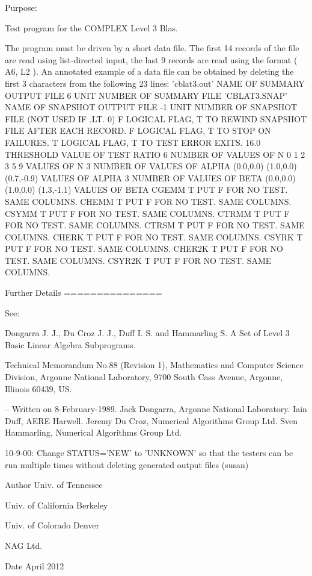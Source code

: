 \begin{DoxyParagraph}{Purpose\+: }
\begin{DoxyVerb} Test program for the COMPLEX          Level 3 Blas.

 The program must be driven by a short data file. The first 14 records
 of the file are read using list-directed input, the last 9 records
 are read using the format ( A6, L2 ). An annotated example of a data
 file can be obtained by deleting the first 3 characters from the
 following 23 lines:
 'cblat3.out'      NAME OF SUMMARY OUTPUT FILE
 6                 UNIT NUMBER OF SUMMARY FILE
 'CBLAT3.SNAP'     NAME OF SNAPSHOT OUTPUT FILE
 -1                UNIT NUMBER OF SNAPSHOT FILE (NOT USED IF .LT. 0)
 F        LOGICAL FLAG, T TO REWIND SNAPSHOT FILE AFTER EACH RECORD.
 F        LOGICAL FLAG, T TO STOP ON FAILURES.
 T        LOGICAL FLAG, T TO TEST ERROR EXITS.
 16.0     THRESHOLD VALUE OF TEST RATIO
 6                 NUMBER OF VALUES OF N
 0 1 2 3 5 9       VALUES OF N
 3                 NUMBER OF VALUES OF ALPHA
 (0.0,0.0) (1.0,0.0) (0.7,-0.9)       VALUES OF ALPHA
 3                 NUMBER OF VALUES OF BETA
 (0.0,0.0) (1.0,0.0) (1.3,-1.1)       VALUES OF BETA
 CGEMM  T PUT F FOR NO TEST. SAME COLUMNS.
 CHEMM  T PUT F FOR NO TEST. SAME COLUMNS.
 CSYMM  T PUT F FOR NO TEST. SAME COLUMNS.
 CTRMM  T PUT F FOR NO TEST. SAME COLUMNS.
 CTRSM  T PUT F FOR NO TEST. SAME COLUMNS.
 CHERK  T PUT F FOR NO TEST. SAME COLUMNS.
 CSYRK  T PUT F FOR NO TEST. SAME COLUMNS.
 CHER2K T PUT F FOR NO TEST. SAME COLUMNS.
 CSYR2K T PUT F FOR NO TEST. SAME COLUMNS.

 Further Details
 ===============

 See:

    Dongarra J. J., Du Croz J. J., Duff I. S. and Hammarling S.
    A Set of Level 3 Basic Linear Algebra Subprograms.

    Technical Memorandum No.88 (Revision 1), Mathematics and
    Computer Science Division, Argonne National Laboratory, 9700
    South Cass Avenue, Argonne, Illinois 60439, US.

 -- Written on 8-February-1989.
    Jack Dongarra, Argonne National Laboratory.
    Iain Duff, AERE Harwell.
    Jeremy Du Croz, Numerical Algorithms Group Ltd.
    Sven Hammarling, Numerical Algorithms Group Ltd.

    10-9-00:  Change STATUS='NEW' to 'UNKNOWN' so that the testers
              can be run multiple times without deleting generated
              output files (susan)\end{DoxyVerb}
 
\end{DoxyParagraph}
\begin{DoxyAuthor}{Author}
Univ. of Tennessee 

Univ. of California Berkeley 

Univ. of Colorado Denver 

N\+A\+G Ltd. 
\end{DoxyAuthor}
\begin{DoxyDate}{Date}
April 2012 
\end{DoxyDate}
